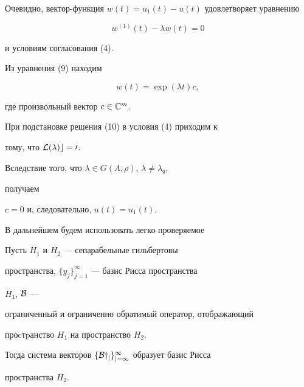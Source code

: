 \begin{pf}
Очевидно, вектор-функция $w(t)=u_1(t)-u(t)$ удовлетворяет уравнению 


\begin{equation} 


w^{(1)}(t)-\lambda w(t)=0 


\end{equation} 


и условиям согласования (4). 


Из уравнения (9) находим 


\begin{equation} 


w(t)=\exp(\lambda t)c, 


\end{equation} 


где произвольный вектор $c\in \Bbb C^m$. 


При подстановке решения (10) в условия (4) приходим к 


тому, что $\cal L(\lambda)c=0$. 


Вследствие того, что $\lambda\in G(\Lambda,\rho)$, $\lambda\ne\lambda_q$, 


получаем 


$c=0$ и, следовательно, $u(t)=u_1(t)$. 


\end{pf} 


 


В дальнейшем будем использовать легко проверяемое 


 


\begin{prop} 


Пусть $H_1$ и $H_2$ --- сепарабельные гильбертовы 


пространства, $\{y_j\}^\infty_{j=1}$ --- базис Рисса пространства 


$H_1$, $\cal B$ --- 


ограниченный и ограниченно обратимый оператор, отображающий 


проcтpанство $H_1$ на пространство $H_2$. 


 


Тогда система векторов $\{\cal B y_j\}^\infty_{j=1}$ образует базис Рисса 


пространства $H_2$. 


\end{prop} 


 


